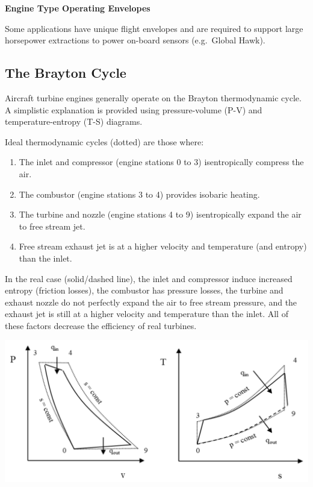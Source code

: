 \documentclass[
]{book}
\providecommand{\tightlist}{%
  \setlength{\itemsep}{0pt}\setlength{\parskip}{0pt}}
\begin{document}
\textbf{Engine Type Operating Envelopes}

Some applications have unique flight envelopes and are required to support large
horsepower extractions to power on-board sensors (e.g.~Global Hawk).

\hypertarget{the-brayton-cycle}{%
\subsection{The Brayton Cycle}\label{the-brayton-cycle}}

Aircraft turbine engines generally operate on the Brayton thermodynamic cycle.
A simplistic explanation is provided using pressure-volume (P-V) and
temperature-entropy (T-S) diagrams.

Ideal thermodynamic cycles (dotted) are those where:

\begin{enumerate}
\def\labelenumi{\arabic{enumi}.}
\tightlist
\item
  The inlet and compressor (engine stations 0 to 3) isentropically compress the
  air.
\item
  The combustor (engine stations 3 to 4) provides isobaric heating.
\item
  The turbine and nozzle (engine stations 4 to 9) isentropically expand the air
  to free stream jet.
\item
  Free stream exhaust jet is at a higher velocity and temperature (and entropy)
  than the inlet.
\end{enumerate}

In the real case (solid/dashed line), the inlet and compressor induce increased
entropy (friction losses), the combustor has pressure losses, the turbine and
exhaust nozzle do not perfectly expand the air to free stream pressure, and the
exhaust jet is still at a higher velocity and temperature than the inlet. All of
these factors decrease the efficiency of real turbines.

\includegraphics{media/17/p-v-t-s.png}
\end{document}
